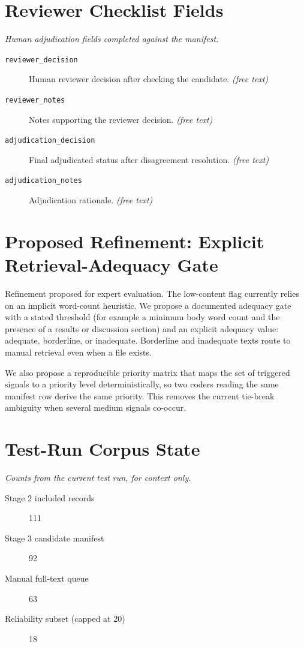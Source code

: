 \documentclass[11pt]{article}
\begin{document}
\section*{Reviewer Checklist Fields}
{\small\itshape Human adjudication fields completed against the manifest.}\par\smallskip
\begin{description}
\item[\texttt{reviewer\_decision}] Human reviewer decision after checking the candidate. \textit{(free text)}
\item[\texttt{reviewer\_notes}] Notes supporting the reviewer decision. \textit{(free text)}
\item[\texttt{adjudication\_decision}] Final adjudicated status after disagreement resolution. \textit{(free text)}
\item[\texttt{adjudication\_notes}] Adjudication rationale. \textit{(free text)}
\end{description}

\section*{Proposed Refinement: Explicit Retrieval-Adequacy Gate}
Refinement proposed for expert evaluation. The low-content flag currently relies on an implicit word-count heuristic. We propose a documented adequacy gate with a stated threshold (for example a minimum body word count and the presence of a results or discussion section) and an explicit adequacy value: adequate, borderline, or inadequate. Borderline and inadequate texts route to manual retrieval even when a file exists.

We also propose a reproducible priority matrix that maps the set of triggered signals to a priority level deterministically, so two coders reading the same manifest row derive the same priority. This removes the current tie-break ambiguity when several medium signals co-occur.


\section*{Test-Run Corpus State}
{\small\itshape Counts from the current test run, for context only.}\par\smallskip
\begin{description}
\item[Stage 2 included records] 111
\item[Stage 3 candidate manifest] 92
\item[Manual full-text queue] 63
\item[Reliability subset (capped at 20)] 18
\end{description}
\end{document}
